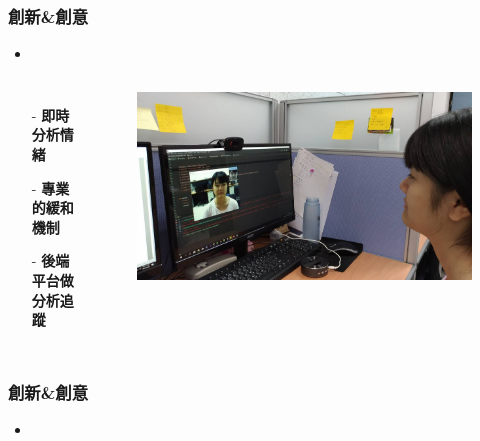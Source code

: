 \documentclass[10pt, conference, compsocconf]{beamer}
\begin{document}
\begin{CJK}{UTF8}{}
\begin{frame}
\end{frame}

\begin{frame}
\frametitle{創新\&創意}

\begin{itemize}
\item{}
\end{itemize}

\begin{columns}
\begin{itemize}
\item[-] \Large\bf 即時分析情緒
\vspace{5mm}
\item[-] \Large\bf 專業的緩和機制
\vspace{5mm}
\item[-] \Large\bf 後端平台做分析追蹤
\end{itemize}

\begin{figure}[!t]
\begin{flushright}
\includegraphics[width=1\textwidth]{Figures/12.jpg}
\end{flushright}
\end{figure}
\end{columns}

\end{frame}

\begin{frame}
\frametitle{創新\&創意}

\begin{itemize}
\item{}
\end{itemize}


\end{frame}
\end{CJK}
\end{document}
